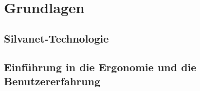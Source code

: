 \chapter{Grundlagen}
\section{Silvanet-Technologie}


\section{Einführung in die Ergonomie und die Benutzererfahrung}
